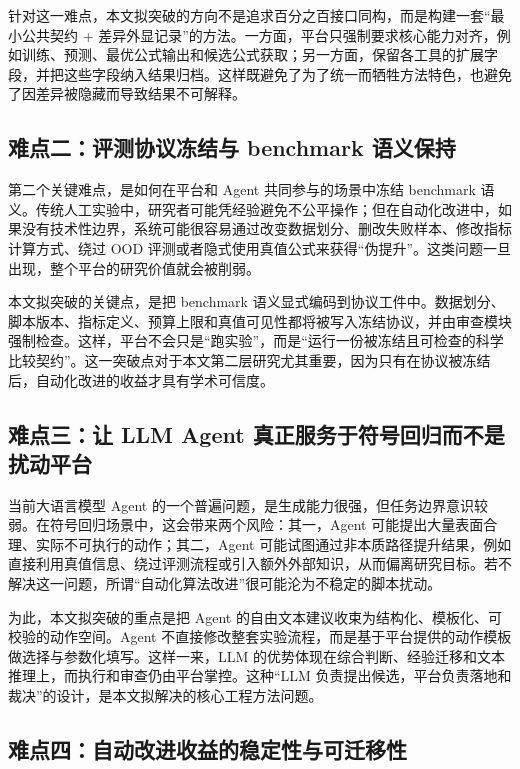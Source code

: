 \documentclass[UTF8,12pt]{ctexart}
\begin{document}
针对这一难点，本文拟突破的方向不是追求百分之百接口同构，而是构建一套“最小公共契约 + 差异外显记录”的方法。一方面，平台只强制要求核心能力对齐，例如训练、预测、最优公式输出和候选公式获取；另一方面，保留各工具的扩展字段，并把这些字段纳入结果归档。这样既避免了为了统一而牺牲方法特色，也避免了因差异被隐藏而导致结果不可解释。

\subsection{难点二：评测协议冻结与 benchmark 语义保持}

第二个关键难点，是如何在平台和 Agent 共同参与的场景中冻结 benchmark 语义。传统人工实验中，研究者可能凭经验避免不公平操作；但在自动化改进中，如果没有技术性边界，系统可能很容易通过改变数据划分、删改失败样本、修改指标计算方式、绕过 OOD 评测或者隐式使用真值公式来获得“伪提升”。这类问题一旦出现，整个平台的研究价值就会被削弱。

本文拟突破的关键点，是把 benchmark 语义显式编码到协议工件中。数据划分、脚本版本、指标定义、预算上限和真值可见性都将被写入冻结协议，并由审查模块强制检查。这样，平台不会只是“跑实验”，而是“运行一份被冻结且可检查的科学比较契约”。这一突破点对于本文第二层研究尤其重要，因为只有在协议被冻结后，自动化改进的收益才具有学术可信度。

\subsection{难点三：让 LLM Agent 真正服务于符号回归而不是扰动平台}

当前大语言模型 Agent 的一个普遍问题，是生成能力很强，但任务边界意识较弱。在符号回归场景中，这会带来两个风险：其一，Agent 可能提出大量表面合理、实际不可执行的动作；其二，Agent 可能试图通过非本质路径提升结果，例如直接利用真值信息、绕过评测流程或引入额外外部知识，从而偏离研究目标。若不解决这一问题，所谓“自动化算法改进”很可能沦为不稳定的脚本扰动。

为此，本文拟突破的重点是把 Agent 的自由文本建议收束为结构化、模板化、可校验的动作空间。Agent 不直接修改整套实验流程，而是基于平台提供的动作模板做选择与参数化填写。这样一来，LLM 的优势体现在综合判断、经验迁移和文本推理上，而执行和审查仍由平台掌控。这种“LLM 负责提出候选，平台负责落地和裁决”的设计，是本文拟解决的核心工程方法问题。

\subsection{难点四：自动改进收益的稳定性与可迁移性}
\end{document}
